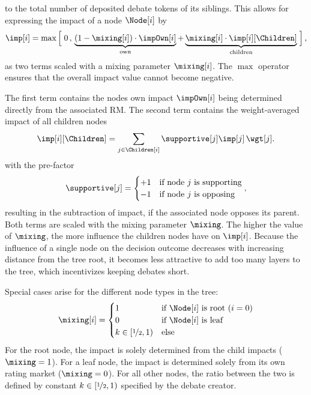 \documentclass[%
aip,
amsmath,amssymb,
reprint,%
unsortedaddress,
nofootinbib
]{revtex4-2}
\begin{document}
to the total number of deposited debate tokens of its siblings.
This allows for expressing the impact of a node $\Node[i]$ by
\begin{equation}\label{eq:Impact}
	\imp[i] = 
	\max
	\left[\vphantom{\sum}\right.
	0
	\,,\,
	\underbrace{(1-\mixing[i])\cdot\impOwn[i]}_{\text{own}} 
	+
	\underbrace{\mixing[i]\cdot\imp[i][\Children]}_{\text{children}}
\left.\vphantom{\sum}\right],
\end{equation}
as two terms scaled with a mixing parameter $\mixing[i]$.
The $\max$ operator ensures that the overall impact value cannot become negative.

The first term contains the nodes own impact $\impOwn[i]$ being determined directly from the associated \ac{RM}.
The second term contains the weight-averaged impact of all children nodes 
\begin{equation}
	\imp[i][\Children] = \sum_{j\in \Children[i]} \supportive[j]%
	\imp[j]\,\wgt[j].
\end{equation}
with the pre-factor
\begin{equation}
	\supportive[j]%
	=
	\begin{cases}
		+1 & \text{if node $j$ is supporting}\\
		-1 & \text{if node $j$ is opposing}
	\end{cases},
\end{equation}
resulting in the subtraction of impact, if the associated node opposes its parent.
Both terms are scaled with the mixing parameter $\mixing$.
The higher the value of $\mixing$, the more influence the children nodes have on $\imp[i]$.
Because the influence of a single node on the decision outcome decreases with increasing distance from the tree root, 
it becomes less attractive to add too many layers to the tree, which incentivizes keeping debates short.

Special cases arise for the different node types in the tree:
\begin{equation}
	\mixing[i] =
	\begin{cases}
		1 & \text{if $\Node[i]$ is root ($i=0$)}\\
		0 & \text{if $\Node[i]$ is leaf}\\
		k \in[\nicefrac{1}{2},1) & \text{else}
	\end{cases}
\end{equation}
For the root node, the impact is solely determined from the child impacts  ($\mixing=1$).
For a leaf node, the impact is determined solely from its own rating market ($\mixing=0$).
For all other nodes,
the ratio between the two is defined by constant $k\in[\nicefrac{1}{2},1)$ specified by the debate creator.
\end{document}
